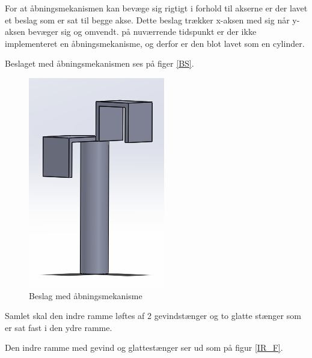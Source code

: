 \noindent
For at åbningsmekanismen kan bevæge sig rigtigt i forhold til akserne er der lavet et beslag som er sat til begge akse. Dette beslag trækker x-aksen med sig når y-aksen bevæger sig og omvendt. på nuværrende tidspunkt er der ikke implementeret en åbningsmekanisme, og derfor er den blot lavet som en cylinder.

Beslaget med åbningsmekanismen ses på figer \ref{BS}.

\begin{figure}[H]
	\centerline{\includegraphics[scale=1]{Konstruktion/Billeder/bs}}
	\caption{Beslag med åbningsmekanisme}
	\label{XA}
\end{figure}

\noindent
Samlet skal den indre ramme løftes af 2 gevindstænger og to glatte stænger som er sat fast i den ydre ramme.

Den indre ramme med gevind og glattestænger ser ud som på figur \ref{IR_F}.

